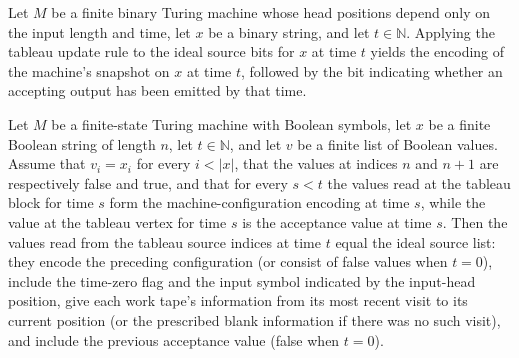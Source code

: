 \begin{theorem}
\label{Complexity.tableauStep_idealSources}
\leanok
{}
Let $M$ be a finite binary Turing machine whose head positions depend only on the input
length and time, let $x$ be a binary string, and let $t\in\mathbb{N}$. Applying the
tableau update rule to the ideal source bits for $x$ at time $t$ yields the encoding of
the machine's snapshot on $x$ at time $t$, followed by the bit indicating whether an
accepting output has been emitted by that time.
\end{theorem}

\begin{theorem}
\label{Complexity.tableauSources_map_getD}
\leanok
{}
Let $M$ be a finite-state Turing machine with Boolean symbols, let $x$ be a finite
Boolean string of length $n$, let $t\in\mathbb{N}$, and let $v$ be a finite list of
Boolean values. Assume that $v_i=x_i$ for every $i<|x|$, that the values at indices $n$
and $n+1$ are respectively false and true, and that for every $s<t$ the values read at
the tableau block for time $s$ form the machine-configuration encoding at time $s$,
while the value at the tableau vertex for time $s$ is the acceptance value at time $s$.
Then the values read from the tableau source indices at time $t$ equal the ideal source
list: they encode the preceding configuration (or consist of false values when $t=0$),
include the time-zero flag and the input symbol indicated by the input-head position,
give each work tape's information from its most recent visit to its current position (or
the prescribed blank information if there was no such visit), and include the previous
acceptance value (false when $t=0$).
\end{theorem}

